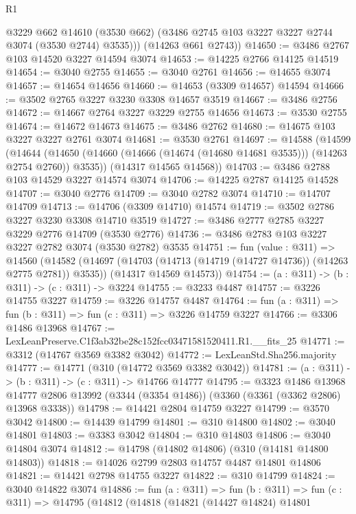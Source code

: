 \begin{lexlean}{R1}
\begin{coremodule}
          @3229
          @662
          @14610
          (@3530 @662)
          (@3486 @2745 @103 @3227 @3227 @2744 @3074 (@3530 @2744) @3535)))
      (@14263 @661 @2743))
@14650 := @3486 @2767 @103 @14520 @3227 @14594 @3074
@14653 := @14225 @2766 @14125 @14519
@14654 := @3040 @2755
@14655 := @3040 @2761
@14656 := @14655 @3074
@14657 := @14654 @14656
@14660 := @14653 (@3309 @14657) @14594
@14666 := @3502 @2765 @3227 @3230 @3308 @14657 @3519
@14667 := @3486 @2756
@14672 := @14667 @2764 @3227 @3229 @2755 @14656
@14673 := @3530 @2755
@14674 := @14672 @14673
@14675 := @3486 @2762
@14680 := @14675 @103 @3227 @3227 @2761 @3074
@14681 := @3530 @2761
@14697 := @14588
    (@14599
      (@14644 (@14650 (@14660 (@14666 (@14674 (@14680 @14681 @3535))) (@14263 @2754 @2760)) @3535))
      (@14317 @14565 @14568))
@14703 := @3486 @2788 @103 @14529 @3227 @14574 @3074
@14706 := @14225 @2787 @14125 @14528
@14707 := @3040 @2776
@14709 := @3040 @2782 @3074
@14710 := @14707 @14709
@14713 := @14706 (@3309 @14710) @14574
@14719 := @3502 @2786 @3227 @3230 @3308 @14710 @3519
@14727 := @3486 @2777 @2785 @3227 @3229 @2776 @14709 (@3530 @2776)
@14736 := @3486 @2783 @103 @3227 @3227 @2782 @3074 (@3530 @2782) @3535
@14751 := fun (value : @311) =>
  @14560
    (@14582
      (@14697 (@14703 (@14713 (@14719 (@14727 @14736)) (@14263 @2775 @2781)) @3535))
      (@14317 @14569 @14573))
@14754 := (a : @311) -> (b : @311) -> (c : @311) -> @3224
@14755 := @3233 @4487
@14757 := @3226 @14755 @3227
@14759 := @3226 @14757 @4487
@14764 := fun (a : @311) => fun (b : @311) => fun (c : @311) => @3226 @14759 @3227
@14766 := @3306 @1486 @13968
@14767 := LexLeanPreserve.C1f3ab32be28c152fcc03471581520411.R1.__fits_25
@14771 := @3312 (@14767 @3569 @3382 @3042)
@14772 := LexLeanStd.Sha256.majority
@14777 := @14771 (@310 (@14772 @3569 @3382 @3042))
@14781 := (a : @311) -> (b : @311) -> (c : @311) -> @14766 @14777
@14795 := @3323
    @1486
    @13968
    @14777
    @2806
    @13992
    (@3344 (@3354 @1486))
    (@3360 (@3361 (@3362 @2806) @13968 @3338))
@14798 := @14421 @2804 @14759 @3227
@14799 := @3570 @3042
@14800 := @14439 @14799
@14801 := @310 @14800
@14802 := @3040 @14801
@14803 := @3383 @3042
@14804 := @310 @14803
@14806 := @3040 @14804 @3074
@14812 := @14798 (@14802 @14806) (@310 (@14181 @14800 @14803))
@14818 := @14026 @2799 @2803 @14757 @4487 @14801 @14806
@14821 := @14421 @2798 @14755 @3227
@14822 := @310 @14799
@14824 := @3040 @14822 @3074
@14886 := fun (a : @311) =>
  fun (b : @311) =>
  fun (c : @311) =>
  @14795
    (@14812
      (@14818
        (@14821
          (@14427 @14824)
          @14801

\end{coremodule}
\end{lexlean}
